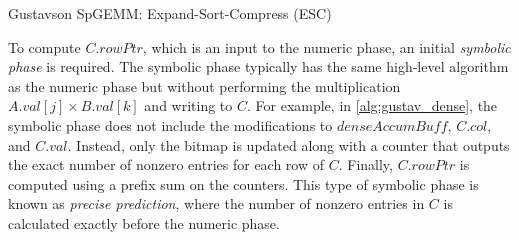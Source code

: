 \begin{algorithm}[htbp]
    \small
    \caption{Gustavson SpGEMM: Expand-Sort-Compress (ESC)}\label{alg:gustav_sort}
    \DontPrintSemicolon
\end{algorithm}

To compute $C.rowPtr$, which is an input to the numeric phase, an initial \emph{symbolic phase} is required.
The symbolic phase typically has the same high-level algorithm as the numeric phase but without performing the multiplication $A.val[j] \times  B.val[k]$ and writing to $C$.
For example, in \autoref{alg:gustav_dense}, the symbolic phase does not include the modifications to $denseAccumBuff$, $C.col$, and $C.val$.
Instead, only the bitmap is updated along with a counter that outputs the exact number of nonzero entries for each row of $C$.
Finally, $C.rowPtr$ is computed using a prefix sum on the counters.
This type of symbolic phase is known as \textit{precise prediction}, where the number of nonzero entries in $C$ is calculated exactly before the numeric phase.

